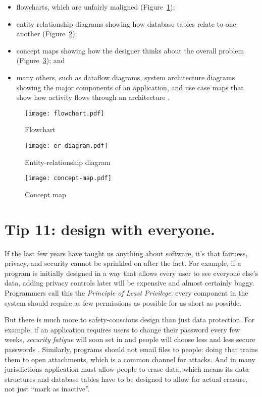 \documentclass[10pt,letterpaper]{article}
\begin{document}
\begin{itemize}
\item
  flowcharts, which are unfairly maligned \cite{Scanlan1989}
  (Figure~\ref{flowchart});
\item
  entity-relationship diagrams showing how database tables relate to one another
  (Figure~\ref{er-diagram});
\item
  concept maps showing how the designer thinks about the overall problem
  (Figure~\ref{concept-map}); and
\item
  many others,
  such as dataflow diagrams,
  system architecture diagrams showing the major components of an application,
  and use case maps that show how activity flows through an architecture \cite{Reekie2006}.
\end{itemize}

\begin{figure}
  \centering
  \texttt{[image: flowchart.pdf]}
  \caption{Flowchart}
  \label{flowchart}
\end{figure}

\begin{figure}
  \centering
  \texttt{[image: er-diagram.pdf]}
  \caption{Entity-relationship diagram}
  \label{er-diagram}
\end{figure}

\begin{figure}
  \centering
  \texttt{[image: concept-map.pdf]}
  \caption{Concept map}
  \label{concept-map}
\end{figure}

\section*{Tip 11: design with everyone.}

If the last few years have taught us anything about software,
it's that fairness, privacy, and security cannot be sprinkled on after the fact.
For example,
if a program is initially designed in a way that allows every user to see everyone else's data,
adding privacy controls later will be expensive and almost certainly buggy.
Programmers call this the \emph{Principle of Least Privilege}:
every component in the system should require as few permissions as possible
for as short as possible.

But there is much more to safety-conscious design than just data protection.
For example,
if an application requires users to change their password every few weeks,
\emph{security fatigue} will soon set in
and people will choose less and less secure passwords \cite{Smalls2021}.
Similarly,
programs should not email files to people:
doing that trains them to open attachments,
which is a common channel for attacks.
And in many jurisdictions application must allow people to erase data,
which means its data structures and database tables have to be designed to allow for actual erasure,
not just ``mark as inactive''.
\end{document}
